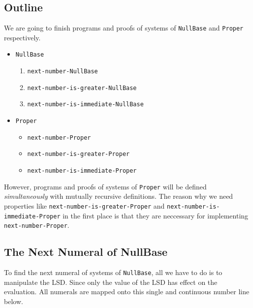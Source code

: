 \documentclass[\main/thesis.tex]{subfiles}
\begin{document}
\subsection{Outline}

We are going to finish programs and proofs of systems of {\lstinline|NullBase|}
and {\lstinline|Proper|} respectively.

\begin{itemize}
    \item {\lstinline|NullBase|}
        \begin{enumerate}
            \item {\lstinline|next-number-NullBase|}
            \item {\lstinline|next-number-is-greater-NullBase|}
            \item {\lstinline|next-number-is-immediate-NullBase|}
        \end{enumerate}
    \item {\lstinline|Proper|}
        \begin{itemize}
            \item {\lstinline|next-number-Proper|}
            \item {\lstinline|next-number-is-greater-Proper|}
            \item {\lstinline|next-number-is-immediate-Proper|}
        \end{itemize}
\end{itemize}

However, programs and proofs of systems of {\lstinline|Proper|} will be defined
\textit{simultaneously} with mutually recursive definitions.
The reason why we need properties like {\lstinline|next-number-is-greater-Proper|}
and {\lstinline|next-number-is-immediate-Proper|} in the first place is that
they are neccessary for implementing {\lstinline|next-number-Proper|}.

\subsection{The Next Numeral of NullBase}

To find the next numeral of systems of {\lstinline|NullBase|},
all we have to do is to manipulate the LSD.
Since only the value of the LSD has effect on the evaluation.
All numerals are mapped onto this single and continuous number line below.
\end{document}

